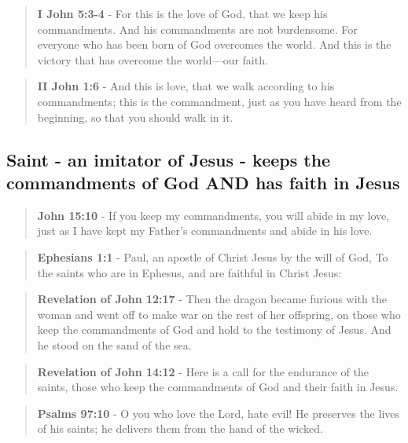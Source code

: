 \documentclass[11pt]{article}
\begin{document}
\begin{quote}
\textbf{I John 5:3-4} - For this is the love of God, that we keep his commandments. And his commandments are not burdensome. For everyone who has been born of God overcomes the world. And this is the victory that has overcome the world—our faith.
\end{quote}

\begin{quote}
\textbf{II John 1:6} - And this is love, that we walk according to his commandments; this is the commandment, just as you have heard from the beginning, so that you should walk in it.
\end{quote}

\subsection{Saint - an imitator of Jesus - keeps the commandments of God AND has faith in Jesus}
\label{sec:org4766bfe}
\begin{quote}
\textbf{John 15:10} - If you keep my commandments, you will abide in my love, just as I have kept my Father's commandments and abide in his love.
\end{quote}

\begin{quote}
\textbf{Ephesians 1:1} - Paul, an apostle of Christ Jesus by the will of God, To the saints who are in Ephesus, and are faithful in Christ Jesus:
\end{quote}

\begin{quote}
\textbf{Revelation of John 12:17} - Then the dragon became furious with the woman and went off to make war on the rest of her offspring, on those who keep the commandments of God and hold to the testimony of Jesus. And he stood on the sand of the sea.
\end{quote}

\begin{quote}
\textbf{Revelation of John 14:12} - Here is a call for the endurance of the saints, those who keep the commandments of God and their faith in Jesus.
\end{quote}

\begin{quote}
\textbf{Psalms 97:10} - O you who love the Lord, hate evil! He preserves the lives of his saints; he delivers them from the hand of the wicked.
\end{quote}
\end{document}
